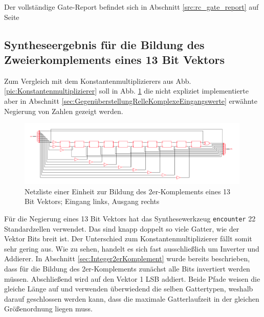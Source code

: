 Der vollständige Gate-Report befindet sich in Abschnitt \ref{src:rc_gate_report} auf Seite \pageref{src:rc_gate_report}



\subsection{Syntheseergebnis für die Bildung des Zweierkomplements eines 13 Bit Vektors}\label{sec:SyntheseergebnisBildungZweierkomplement}

Zum Vergleich mit dem Konstantenmultiplizierers aus Abb. \ref{pic:Konstantenmultiplizierer} soll in Abb. \ref{pic:13BitInverter} die nicht expliziet implementierte aber in Abschnitt
\ref{sec:GegenüberstellungRelleKomplexeEingangswerte} erwähnte Negierung von Zahlen gezeigt werden.

\begin{figure}[htpb]
\centering
\includegraphics[width=0.99\textwidth]{img/13Bit_Inverter_Netlist.png}
\caption{Netzliste einer Einheit zur Bildung des 2er-Komplements eines 13 Bit Vektors; Eingang links, Ausgang rechts}
\label{pic:13BitInverter}
\end{figure}

Für die Negierung eines 13 Bit Vektors hat das Synthesewerkzeug \texttt{encounter} 22 Standardzellen verwendet. Das sind knapp doppelt so viele Gatter, wie der Vektor 
Bits breit ist. Der Unterschied zum Konstantenmultiplizierer fällt somit sehr gering aus. 
Wie zu sehen, handelt es sich fast ausschließlich um Inverter und Addierer. In Abschnitt \ref{sec:Integer2erKomplement} wurde bereits beschrieben, dass für die Bildung des
2er-Komplements zunächst alle Bits invertiert werden müssen. Abschließend wird auf den Vektor 1 LSB addiert. 
Beide Pfade weisen die gleiche Länge auf und verwenden überwiedend die selben
Gattertypen, weshalb darauf geschlossen werden kann, dass die maximale Gatterlaufzeit in der gleichen Größenordnung liegen muss.